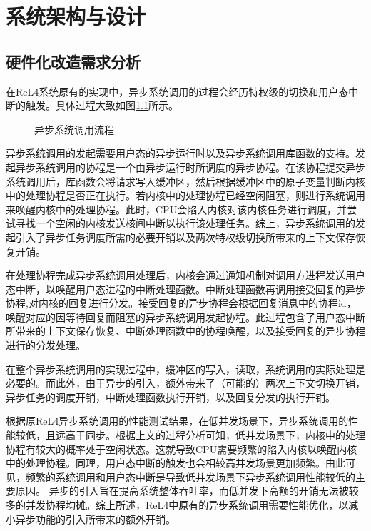 \chapter{系统架构与设计}

\section{硬件化改造需求分析}\label{sec:syscallanalysis}

在ReL4系统原有的实现中，异步系统调用的过程会经历特权级的切换和用户态中断的触发。具体过程大致如图\ref{asyncsyscall}所示。

\begin{figure}[htbp]
    \centering
    
    \caption{异步系统调用流程}\label{asyncsyscall}
\end{figure}

异步系统调用的发起需要用户态的异步运行时以及异步系统调用库函数的支持。发起异步系统调用的协程是一个由异步运行时所调度的异步协程。在该协程提交异步系统调用后，库函数会将请求写入缓冲区，然后根据缓冲区中的原子变量判断内核中的处理协程是否正在执行。若内核中的处理协程已经空闲阻塞，则进行系统调用来唤醒内核中的处理协程。此时，CPU会陷入内核对该内核任务进行调度，并尝试寻找一个空闲的内核发送核间中断以执行该处理任务。综上，异步系统调用的发起引入了异步任务调度所需的必要开销以及两次特权级切换所带来的上下文保存恢复开销。

在处理协程完成异步系统调用处理后，内核会通过通知机制对调用方进程发送用户态中断，以唤醒用户态进程的中断处理函数。中断处理函数再调用接受回复的异步协程,对内核的回复进行分发。接受回复的异步协程会根据回复消息中的协程id，唤醒对应的因等待回复而阻塞的异步系统调用发起协程。此过程包含了用户态中断所带来的上下文保存恢复、中断处理函数中的协程唤醒，以及接受回复的异步协程进行的分发处理。

在整个异步系统调用的实现过程中，缓冲区的写入，读取，系统调用的实际处理是必要的。而此外，由于异步的引入，额外带来了（可能的）两次上下文切换开销，异步任务的调度开销，中断处理函数执行开销，以及回复分发的执行开销。

根据原ReL4异步系统调用的性能测试结果，在低并发场景下，异步系统调用的性能较低，且远高于同步。根据上文的过程分析可知，低并发场景下，内核中的处理协程有较大的概率处于空闲状态。这就导致CPU需要频繁的陷入内核以唤醒内核中的处理协程。同理，用户态中断的触发也会相较高并发场景更加频繁。由此可见，频繁的系统调用和用户态中断是导致低并发场景下异步系统调用性能较低的主要原因。
异步的引入旨在提高系统整体吞吐率，而低并发下高额的开销无法被较多的并发协程均摊。综上所述，ReL4中原有的异步系统调用需要性能优化，以减小异步功能的引入所带来的额外开销。

